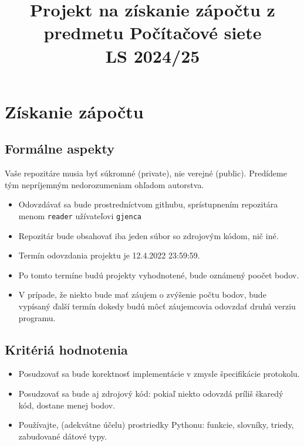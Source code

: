 \documentclass[11pt]{article}
\theoremstyle{definition}
\begin{document}
\title{Projekt na získanie zápočtu z predmetu Počítačové siete\\LS 2024/25}
\maketitle
\section{Získanie zápočtu}
\subsection{Formálne aspekty}

\begin{tcolorbox}[colback=red!5!white,colframe=red!75!black]
Vaše repozitáre musia byť súkromné (private), nie verejné (public). Predídeme
tým nepríjemným nedorozumeniam ohľadom autorstva.
\end{tcolorbox}

\begin{itemize}
\item Odovzdávať sa bude prostredníctvom githubu, sprístupnením repozitára
menom \texttt{reader} užívateľovi \texttt{gjenca}
\item Repozitár bude obsahovať iba jeden súbor so zdrojovým kódom, nič iné.
\item Termín odovzdania projektu je 12.4.2022 23:59:59.
\item Po tomto termíne budú projekty vyhodnotené, bude oznámený poočet
bodov.
\item V prípade, že niekto bude mať záujem o zvýšenie počtu bodov, bude
vypísaný ďalší termín dokedy budú môcť záujemcovia odovzdať druhú verziu
programu.
\end{itemize}

\subsection{Kritériá hodnotenia}
\begin{itemize}
\item Posudzovať sa bude korektnosť implementácie v zmysle špecifikácie protokolu.
\item Posudzovať sa bude aj zdrojový kód: pokiaľ niekto odovzdá príliš škaredý kód,
dostane menej bodov.
\item Používajte, (adekvátne účelu) prostriedky Pythonu: funkcie, slovníky, triedy, zabudované dátové typy.
\end{itemize}
\end{document}
